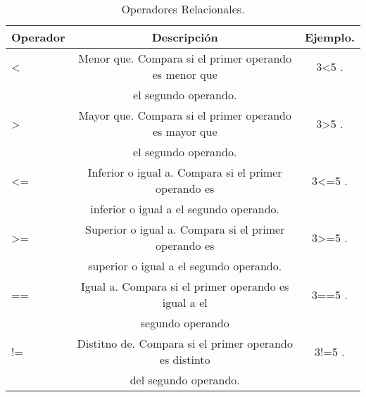 \begin{table}[H]
\centering
\begin{tabular} {l | c | c }
\hline
Operador & Descripción & Ejemplo. \\ \hline
< & Menor que. Compara si el primer operando es menor que & 3<5 .\\ 
  & el segundo operando.                                  &       \\ \hline 
> & Mayor que. Compara si el primer operando es mayor que & 3>5 .\\ 
  & el segundo operando.                                  &       \\ \hline 
<= & Inferior o igual a. Compara si el primer operando es & 3<=5 . \\ 
   & inferior o igual a el segundo operando. 		  & 	\\ \hline
>= & Superior o igual a. Compara si el primer operando es &  3>=5 . \\ 
   & superior o igual a el segundo operando.		  &  	\\ \hline
== & Igual a. Compara si el primer operando es igual a el & 3==5 . \\ 
   & segundo operando					  &	\\ \hline
!= & Distitno de. Compara si el primer operando es distinto & 3!=5 . \\ 
   & del segundo operando.				&  	\\ \hline
	\end{tabular} 
\\
\caption{\label{tab:Operadores Relacionales}Operadores Relacionales.}
\end{table}
\pagebreak


